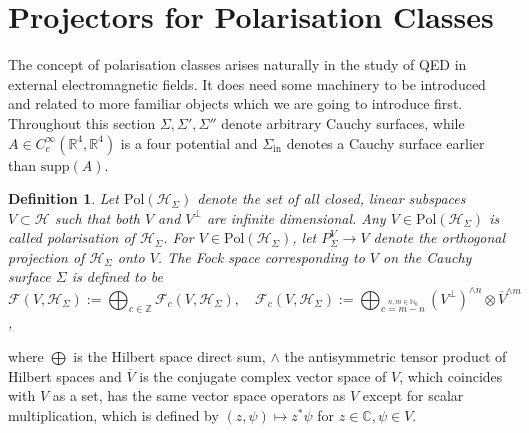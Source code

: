 \documentclass[a4paper,11pt]{article}
\newtheorem{de}{Definition}
\begin{document}



\section{Projectors for Polarisation Classes}\label{sec:pol classes}

The concept of polarisation classes arises naturally in the study of QED in external electromagnetic fields. It does need some
machinery to be introduced and related to more familiar objects which we are going to introduce first. Throughout this section
\(\Sigma, \Sigma', \Sigma''\) denote arbitrary Cauchy surfaces, while \(A\in C_c^\infty(\mathbb{R}^4,\mathbb{R}^4)\) 
is a four potential and \(\Sigma_{\text{in}}\) denotes a Cauchy surface earlier than \(\text{supp}(A)\).

\begin{de}
Let \(\text{Pol} (\mathcal{H}_\Sigma)\) denote the set of all closed, linear subspaces \(V\subset \mathcal{H}\)
such that both \(V\) and \(V^\perp\) are infinite dimensional. Any \(V\in \text{Pol}(\mathcal{H}_\Sigma)\) is called 
\emph{polarisation} of \(\mathcal{H}_\Sigma\). For \(V\in \text{Pol}(\mathcal{H}_\Sigma)\), let \(P_\Sigma^V\rightarrow V\) 
denote the orthogonal projection of \(\mathcal{H}_\Sigma\) onto \(V\).
The Fock space corresponding to \(V\) on the Cauchy surface \(\Sigma\) is defined to be
\begin{equation}
\mathcal{F}(V,\mathcal{H}_\Sigma) := \bigoplus_{c\in\mathbb{Z}} \mathcal{F}_c (V,\mathcal{H}_\Sigma), \quad 
\mathcal{F}_c(V,\mathcal{H}_\Sigma):= \bigoplus_{\overset{n,m\in\mathbb{N}_0}{c=m-n}}(V^\perp)^{\wedge n} \otimes \overline{V}^{\wedge m}
\end{equation},
\end{de}

where \(\bigoplus\) is the Hilbert space direct sum, \(\wedge\) the antisymmetric tensor product of Hilbert spaces and 
\(\overline{V}\) is the conjugate complex vector space of \(V\), which coincides with \(V\) as a set, has the same vector 
space operators as \(V\) except for scalar multiplication, which is defined by \((z,\psi)\mapsto z^* \psi\) for 
\(z\in\mathbb{C},\psi\in V\).
\end{document}
